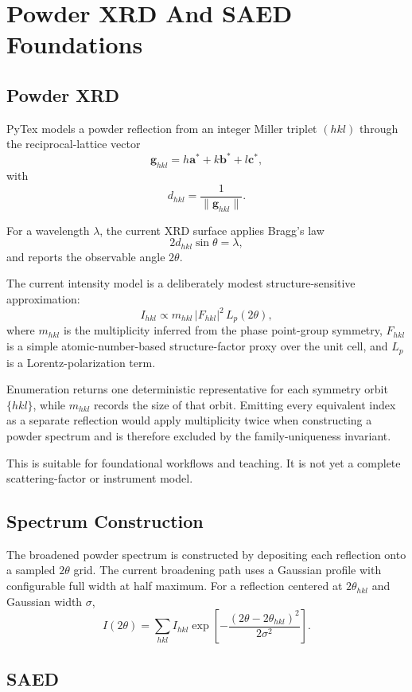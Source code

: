 \section{Powder XRD And SAED Foundations}

\subsection{Powder XRD}

PyTex models a powder reflection from an integer Miller triplet $(hkl)$ through the reciprocal-lattice vector
\[
\mathbf{g}_{hkl} = h \mathbf{a}^{*} + k \mathbf{b}^{*} + l \mathbf{c}^{*},
\]
with
\[
d_{hkl} = \frac{1}{\lVert \mathbf{g}_{hkl} \rVert}.
\]

For a wavelength $\lambda$, the current XRD surface applies Bragg's law
\[
2 d_{hkl} \sin \theta = \lambda,
\]
and reports the observable angle $2\theta$.

The current intensity model is a deliberately modest structure-sensitive approximation:
\[
I_{hkl} \propto m_{hkl} \, |F_{hkl}|^2 \, L_{p}(2\theta),
\]
where $m_{hkl}$ is the multiplicity inferred from the phase point-group symmetry, $F_{hkl}$ is a simple atomic-number-based structure-factor proxy over the unit cell, and $L_p$ is a Lorentz-polarization term.

Enumeration returns one deterministic representative for each symmetry orbit $\{hkl\}$, while
$m_{hkl}$ records the size of that orbit. Emitting every equivalent index as a separate reflection
would apply multiplicity twice when constructing a powder spectrum and is therefore excluded by the
family-uniqueness invariant.

This is suitable for foundational workflows and teaching. It is not yet a complete scattering-factor or instrument model.

\subsection{Spectrum Construction}

The broadened powder spectrum is constructed by depositing each reflection onto a sampled $2\theta$ grid. The current broadening path uses a Gaussian profile with configurable full width at half maximum. For a reflection centered at $2\theta_{hkl}$ and Gaussian width $\sigma$,
\[
I(2\theta) = \sum_{hkl} I_{hkl} \exp\left[-\frac{(2\theta - 2\theta_{hkl})^2}{2\sigma^2}\right].
\]

\subsection{SAED}

